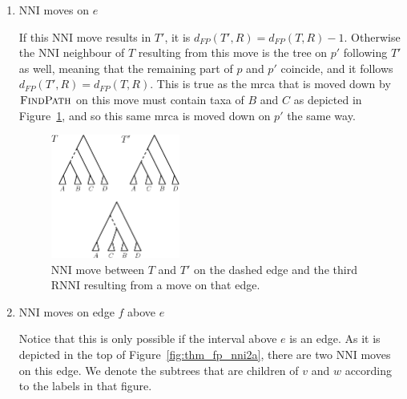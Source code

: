 \documentclass{amsart}
\newcommand{\rnni}{\mathrm{RNNI}}
\newcommand{\findpath}{\textsc{FindPath}}
\newcommand{\mrca}{\mathrm{mrca}}
\newcommand{\nni}{\mathrm{NNI}}
\begin{document}
\begin{enumerate}
    \item $\nni$ moves on $e$

    If this $\nni$ move results in $T'$, it is $d_{FP}(T',R) = d_{FP}(T,R) - 1$.
    Otherwise the $\nni$ neighbour of $T$ resulting from this move is the tree on $p'$ following $T'$ as well, meaning that the remaining part of $p$ and $p'$ coincide, and it follows $d_{FP}(T',R) = d_{FP}(T,R)$.
    This is true as the $\mrca$ that is moved down by $\findpath$ on this move must contain taxa of $B$ and $C$ as depicted in Figure~\ref{fig:thm_fp_nni1}, and so this same $\mrca$ is moved down on $p'$ the same way.

    \begin{figure}[!hbt]
    \centering
    \includegraphics[width=0.4\textwidth]{thm_fp_nni1}
    \vspace{12pt}
    \caption{$\nni$ move between $T$ and $T'$ on the dashed edge and the third $\rnni$ resulting from a move on that edge.}
    \label{fig:thm_fp_nni1}
    \end{figure}

    \item $\nni$ moves on edge $f$ above $e$

    Notice that this is only possible if the interval above $e$ is an edge.
    As it is depicted in the top of Figure~\ref{fig:thm_fp_nni2a}, there are two $\nni$ moves on this edge.
    We denote the subtrees that are children of $v$ and $w$ according to the labels in that figure.


\end{enumerate}
\end{document}
